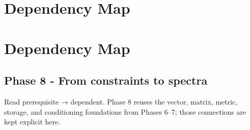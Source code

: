\hypertarget{appendix-4ad47bdd269a}{}
\section*{Dependency Map}
\section{Dependency Map}\label{appendix-4ad47bdd269a-dependency-map}

\subsection{Phase 8 - From constraints to spectra}\label{appendix-4ad47bdd269a-phase-8---from-constraints-to-spectra}

Read prerequisite → dependent. Phase 8 reuses the vector, matrix, metric, storage, and conditioning foundations from Phases 6--7; those connections are kept explicit here.

